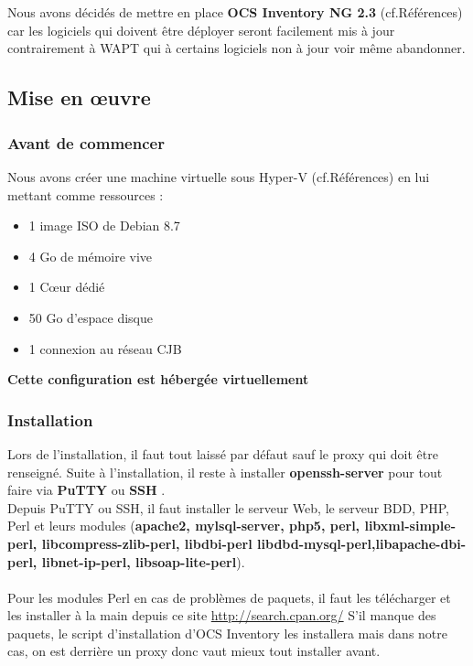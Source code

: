 \documentclass[11pt,a4paper,oneside]{article}
\begin{document}
\\ \\
Nous avons décidés de mettre en place \textbf{OCS Inventory NG 2.3} (cf.Références) car les logiciels qui doivent être déployer seront facilement mis à jour contrairement à WAPT qui à certains logiciels non à jour voir même abandonner.
\newpage
\subsection{Mise en \oe{}uvre}
\subsubsection{Avant de commencer} 
Nous avons créer une machine virtuelle sous Hyper-V (cf.Références) en lui mettant comme ressources :\\ \begin{itemize}
				\item 1 image ISO de Debian 8.7
				\item 4 Go de mémoire vive
				\item 1 C{\oe}ur dédié
				\item 50 Go d'espace disque
				\item 1 connexion au réseau CJB	
\end{itemize} 

\begin{center}
\textbf{Cette configuration est hébergée virtuellement}
\end{center}
\subsubsection{Installation}
Lors de l'installation, il faut tout laissé par défaut sauf le proxy qui doit être renseigné. Suite à l'installation, il reste à installer \textbf{openssh-server} pour tout faire via \textbf{PuTTY} ou \textbf{SSH} .\\

Depuis PuTTY ou SSH, il faut installer le serveur Web, le serveur BDD, PHP, Perl et leurs modules (\textbf{apache2, mylsql-server, php5, perl, libxml-simple-perl, libcompress-zlib-perl, libdbi-perl libdbd-mysql-perl,libapache-dbi-perl, libnet-ip-perl, libsoap-lite-perl}).\\ \\
Pour les modules Perl en cas de problèmes de paquets, il faut les télécharger et les installer à la main depuis ce site \url{http://search.cpan.org/} 
S'il manque des paquets, le script d'installation d'OCS Inventory les installera mais dans notre cas, on est derrière un proxy donc vaut mieux tout installer avant. \\
\end{document}
